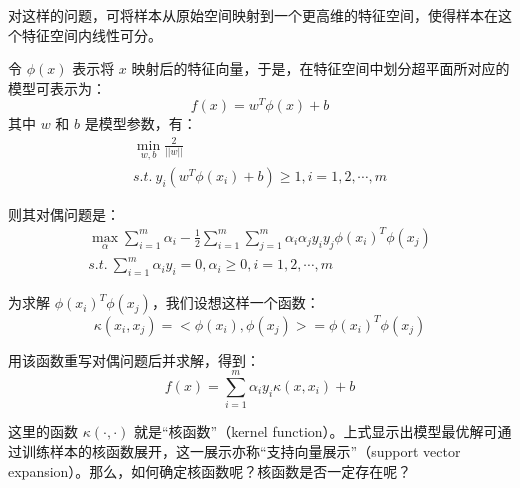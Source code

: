 \documentclass[12pt, a4paper]{article} %
\begin{document}
对这样的问题，可将样本从原始空间映射到一个更高维的特征空间，使得样本在这个特征空间内线性可分。

令 $\phi (x)$ 表示将 $x$ 映射后的特征向量，于是，在特征空间中划分超平面所对应的模型可表示为：
\begin{equation*}
    f(x) = w^T \phi(x) + b
\end{equation*}
其中 $w$ 和 $b$ 是模型参数，有：
\begin{equation*}
    \begin{array}{*{20}{l}}
        \displaystyle \min_{w, b} \frac{2}{||w||} \\
        \displaystyle s.t. \ y_i(w^T \phi(x_i) + b) \ge 1, i = 1, 2, \cdots, m
    \end{array}
\end{equation*}

则其对偶问题是：
\begin{equation*}
    \begin{array}{*{20}{l}}
        \displaystyle \max_{\alpha} \sum_{i = 1}^{m} \alpha_i - \frac{1}{2} \sum_{i = 1}^{m} \sum_{j = 1}^{m} \alpha_i \alpha_j y_i y_j \phi(x_i) ^T \phi(x_j) \\
        \displaystyle s.t. \ \sum_{i = 1}^{m} \alpha_i y_i = 0, \alpha_i \ge 0, i = 1, 2, \cdots, m
    \end{array}
\end{equation*}

为求解 $\phi(x_i) ^T \phi(x_j)$，我们设想这样一个函数：
\begin{equation*}
    \kappa (x_i, x_j) = <\phi(x_i), \phi(x_j)> = \phi(x_i) ^T \phi(x_j)
\end{equation*}

用该函数重写对偶问题后并求解，得到：
\begin{equation*}
    f(x) = \sum_{i = 1}^{m} \alpha_i y_i \kappa(x, x_i) + b
\end{equation*}

这里的函数 $\kappa (\cdot, \cdot)$ 就是“核函数”（kernel function）。上式显示出模型最优解可通过训练样本的核函数展开，这一展示亦称“支持向量展示”（support vector expansion）。那么，如何确定核函数呢？核函数是否一定存在呢？
\end{document}
